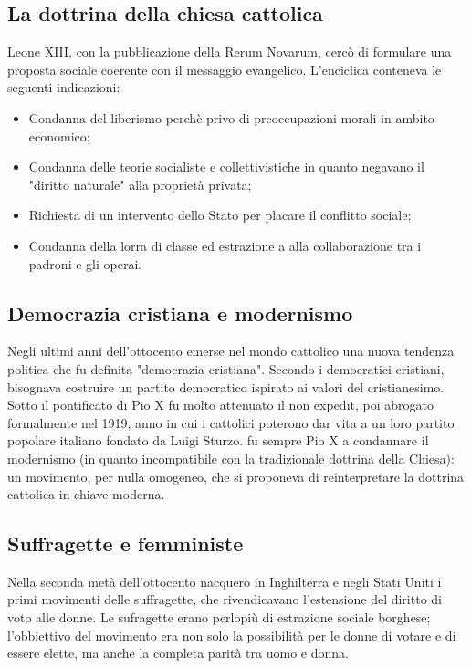 \documentclass{report}
\begin{document}
\subsection{La dottrina della chiesa cattolica}
Leone XIII, con la pubblicazione della Rerum Novarum, cercò di formulare una proposta sociale coerente con il messaggio evangelico. L'enciclica conteneva le seguenti indicazioni:

\begin{itemize}
  \item Condanna del liberismo perchè privo di preoccupazioni morali in ambito economico;
  \item Condanna delle teorie socialiste e collettivistiche in quanto negavano il "diritto naturale" alla proprietà privata;
  \item Richiesta di un intervento dello Stato per placare il conflitto sociale;
  \item Condanna della lorra di classe ed estrazione a alla collaborazione tra i padroni e gli operai.
\end{itemize}

\subsection{Democrazia cristiana e modernismo}
Negli ultimi anni dell'ottocento emerse nel mondo cattolico una nuova tendenza politica che fu definita "democrazia cristiana".
Secondo i democratici cristiani, bisognava costruire un partito democratico ispirato ai valori del cristianesimo.
Sotto il pontificato di Pio X fu molto attenuato il non expedit, poi abrogato formalmente nel 1919, anno in cui i cattolici poterono dar vita a un loro partito popolare italiano fondato da Luigi Sturzo.
fu sempre Pio X a condannare il modernismo (in quanto incompatibile con la tradizionale dottrina della Chiesa): un movimento, per nulla omogeneo, che si proponeva di reinterpretare la dottrina cattolica in chiave moderna.

\subsection{Suffragette e femministe}
Nella seconda metà dell'ottocento nacquero in Inghilterra e negli Stati Uniti i primi movimenti delle suffragette, che rivendicavano l'estensione del diritto di voto alle donne. Le sufragette erano perlopiù di estrazione sociale borghese; l'obbiettivo del movimento era non solo la possibilità per le donne di votare e di essere elette, ma anche la completa parità tra uomo e donna.
\end{document}
